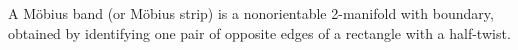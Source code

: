 A Möbius band (or Möbius strip) is a nonorientable 2-manifold with boundary, obtained by identifying one pair of opposite edges of a rectangle with a half-twist.

